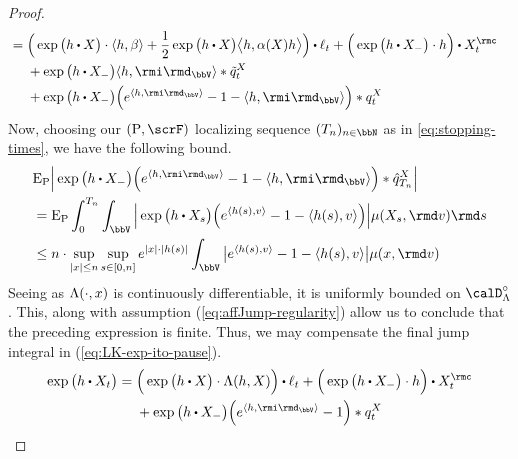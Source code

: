 \begin{proof}
\begin{align}
    \label{eq:LK-exp-ito-pause}
    &= \begin{aligned}[t]
      &\Big(\exp\big( \twistFunc \shortInt \X \big) \cdot \prj{\twistFunc}{\affDrift} + \frac12 \exp\big( \twistFunc \shortInt \X \big) \bprj{\twistFunc}{\affDiff(\X)\twistFunc} \Big) \shortInt \leb_t + \Big( \exp\big( \twistFunc \shortInt \X_- \big) \cdot \twistFunc \Big) \shortInt \X^\rmc_t \\
      &+ \exp\big( \twistFunc \shortInt \X_- \big) \prj{\twistFunc}{\id_\vecSpace} \ast \compensate{\jumpMeas^\X}_t \\
      &+ \exp\big(\twistFunc\shortInt\X_-\big) \Big( e^{\prj{\twistFunc}{\id_\vecSpace}} - 1 - \prj{\twistFunc}{\id_\vecSpace} \Big) \ast \jumpMeas^\X_t
    \end{aligned} 
  \end{align}
  Now, choosing our $(\Prb, \scrF)$ localizing sequence $(T_n)_{n\in\bbN}$ as in \ref{eq:stopping-times}, we have the following bound.
  \begin{align*}
    &\Exp_\Prb \Big| \exp\big(\twistFunc \shortInt \X_- \big) \Big(e^\prj{\twistFunc}{\id_\vecSpace} - 1 - \prj{\twistFunc}{\id_\vecSpace} \Big) \ast \predproj{\jumpMeas^\X}_{T_n} \Big| \\
    &= \Exp_\Prb \int_0^{T_n} \int_\vecSpace \Big| \exp\big(\twistFunc \shortInt \X_s \big) \Big( e^\prj{\twistFunc(s)}{\markVar} - 1 - \prj{\twistFunc(s)}{\markVar} \Big) \Big| \affJump(\X_s, \rmd\markVar) \rmd s \\
    &\leq n \cdot \sup_{|\stateVar| \leq n} \sup_{s \in [0,n]} e^{|\stateVar|\cdot|\twistFunc(s)|} \int_\vecSpace \big| e^\prj{\twistFunc(s)}{\markVar} - 1 - \prj{\twistFunc(s)}{\markVar} \big| \affJump(\stateVar, \rmd\markVar) 
  \end{align*}
  Seeing as $\Lambda(\cdot, x)$ is continuously differentiable, it is uniformly bounded on $\odeSpace^\circ$.
  This, along with assumption (\ref{eq:affJump-regularity}) allow us to conclude that the preceding expression is finite.
  Thus, we may compensate the final jump integral in (\ref{eq:LK-exp-ito-pause}).
  \begin{equation*}
    \exp\big( \twistFunc \shortInt \X_t \big) 
    = \begin{aligned}[t]
      &\Big(\exp\big( \twistFunc \shortInt \X \big) \cdot \ode(\twistFunc, \X) \Big) \shortInt \leb_t + \Big( \exp\big( \twistFunc \shortInt \X_- \big) \cdot \twistFunc \Big) \shortInt \X^\rmc_t \\
      &+ \exp\big(\twistFunc\shortInt\X_-\big) \Big( e^{\prj{\twistFunc}{\id_\vecSpace}} - 1 \Big) \ast \jumpMeas^\X_t

\end{aligned}
\end{equation*}
\end{proof}
